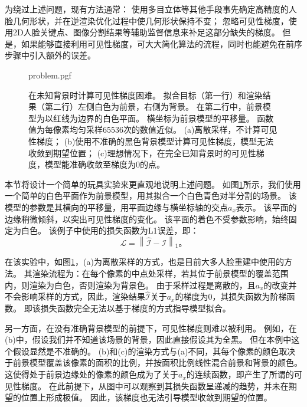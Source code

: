 为绕过上述问题，现有方法通常：
使用多目立体等其他手段事先确定高精度的人脸几何形状，并在逆渲染优化过程中使几何形状保持不变\citep{RiviereGBGB20}；
忽略可见性梯度，使用2D人脸关键点\citep{deep3d}、图像分割\citep{nvdiffrec}结果等辅助监督信息来补足这部分缺失的梯度。
但是，如果能够直接利用可见性梯度，可大大简化算法的流程，同时也能避免在前序步骤中引入额外的误差。

\begin{figure}
    \centering
    {problem.pgf}
    \caption[在未知背景时计算可见性梯度困难]{
        在未知背景时计算可见性梯度困难。
        拟合目标（第一行）和渲染结果（第二行）左侧白色为前景，右侧为背景。
        在第二行中，前景模型为以红线为边界的白色平面。
        横坐标为前景模型的平移量。
        函数值为每像素均匀采样65536次的数值近似。
        (a)离散采样，不计算可见性梯度；
        (b)使用不准确的黑色背景模型计算可见性梯度，模型无法收敛到期望位置；
        (c)理想情况下，在完全已知背景时的可见性梯度，模型能准确收敛至梯度为0的点。
    }
    \label{fig:problem}
\end{figure}
本节将设计一个简单的玩具实验来更直观地说明上述问题。
如图\ref{fig:problem}所示，我们使用一个简单的白色平面作为前景模型，用其拟合一个白色青色对半分割的场景。
该模型的参数是其横向的平移量，用平面边缘与横坐标轴的交点$a_x$表示。
该平面的边缘稍微倾斜，以突出可见性梯度的变化。
该平面的着色不受参数影响，始终固定为白色。
该例子中使用的损失函数为L1误差，即：
\begin{equation}
\mathcal{L} = \left\| \hat{\mathcal{I}} - \mathcal{I} \right\|_1
\text{。}
\label{eq:loss_l1}
\end{equation}

在该实验中，如图\ref{fig:problem}，(a)为离散采样的方式，也是目前大多人脸重建中使用的方法。
其渲染流程为：在每个像素的中点处采样，若其位于前景模型的覆盖范围内，则渲染为白色，否则渲染为背景色。
由于采样过程是离散的，且$a_x$的改变并不会影响采样的方式，因此，渲染结果$\hat{\mathcal{I}}$关于$a_x$的梯度为0，其损失函数为阶梯函数。
即该损失函数完全无法以基于梯度的方式指导模型拟合。

另一方面，在没有准确背景模型的前提下，可见性梯度则难以被利用。
例如，在(b)中，假设我们并不知道该场景的背景，因此直接假设其为全黑。
但在本例中这个假设显然是不准确的。
(b)和(c)的渲染方式与(a)不同，其每个像素的颜色取决于前景模型覆盖该像素的面积的比例，并按面积比例线性混合前景和背景的颜色。
这使得处于前景边缘处的像素的颜色成为了关于$a_x$的连续函数，即产生了所谓的可见性梯度。
在此前提下，从图中可以观察到其损失函数呈递减的趋势，并未在期望的位置上形成极值。
因此，该梯度也无法引导模型收敛到期望的位置。

